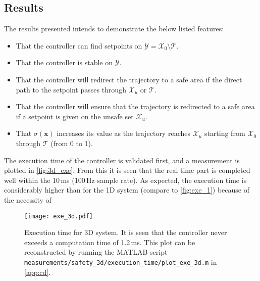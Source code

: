 \subsection{Results}
The results presented intends to demonstrate the below listed features:
\vspace{-3mm}
\begin{itemize}
	\itemsep-0.6mm
\item That the controller can find setpoints on $\mathcal{Y}=\mathcal{X}_0\setminus\mathcal{T}$.
\item That the controller is stable on $\mathcal{Y}$.
\item That the controller will redirect the trajectory to a safe area if the direct path to the setpoint passes through $\mathcal{X}_u$ or $\mathcal{T}$.
\item That the controller will ensure that the trajectory is redirected to a safe area if a setpoint is given on the unsafe set $\mathcal{X}_u$.
\item That $\sigma (\textbf{x})$ increases its value as the trajectory reaches $\mathcal{X}_u$ starting from $\mathcal{X}_0$ through $\mathcal{T}$ (from 0 to 1).
\end{itemize}

The execution time of the controller is validated first, and a measurement is plotted in \autoref{fig:3d_exe}. From this it is seen that the real time part is completed well within the 10\,ms (100\,Hz sample rate). As expected, the execution time is considerably higher than for the 1D system (compare to \autoref{fig:exe_1}) because of the necessity of 

\begin{figure}[h]
	\texttt{[image: exe\_3d.pdf]}
	\caption{Execution time for 3D system. It is seen that the controller never exceeds a computation time of 1.2\,ms. This plot can be reconstructed by running the MATLAB script \texttt{measurements/safety\_3d/execution\_time/plot\_exe\_3d.m} in \autoref{app:cd}.}
	\label{fig:3d_exe}
\end{figure}

